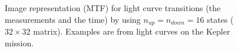 

\begin{figure}[!t]
    \centering
    \qquad
    \caption{Image representation (MTF) for light curve transitions (the measurements and the time) by using $n_{up}=n_{down}=16$ states ($32\times 32$ matrix). Examples are from light curves on the Kepler mission.}%
    \label{fig:mtf_ex:prop}
\end{figure}


